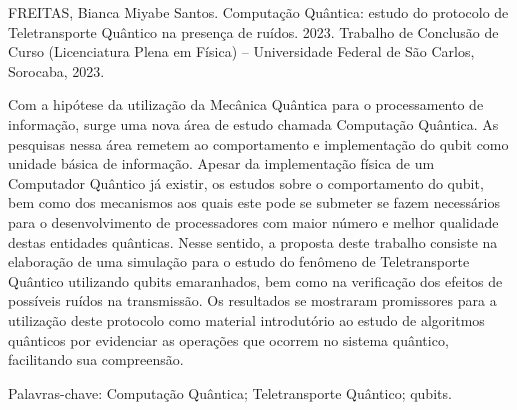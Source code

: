 
\begin{resumo} %
  FREITAS, Bianca Miyabe Santos. Computação Quântica: estudo do protocolo de Teletransporte Quântico na presença de ruídos. 2023. Trabalho de Conclusão de Curso (Licenciatura Plena em Física) -- Universidade Federal de São Carlos, Sorocaba, 2023.

  \vspace*{\onelineskip}
  Com a hipótese da utilização da Mecânica Quântica para o processamento de informação, surge uma nova área de estudo chamada Computação Quântica. As pesquisas nessa área remetem ao comportamento e implementação do qubit como unidade básica de informação. Apesar da implementação física de um Computador Quântico já existir, os estudos sobre o comportamento do qubit, bem como dos mecanismos aos quais este pode se submeter se fazem necessários para o desenvolvimento de processadores com maior número e melhor qualidade destas entidades quânticas. Nesse sentido, a proposta deste trabalho consiste na elaboração de uma simulação para o estudo do fenômeno de Teletransporte Quântico utilizando qubits emaranhados, bem como na verificação dos efeitos de possíveis ruídos na transmissão. Os resultados se mostraram promissores para a utilização deste protocolo como material introdutório ao estudo de algoritmos quânticos por evidenciar as operações que ocorrem no sistema quântico, facilitando sua compreensão.

  \vspace{\onelineskip}

  \noindent
  Palavras-chave: Computação Quântica; Teletransporte Quântico; qubits.
\end{resumo}

\cleardoublepage

